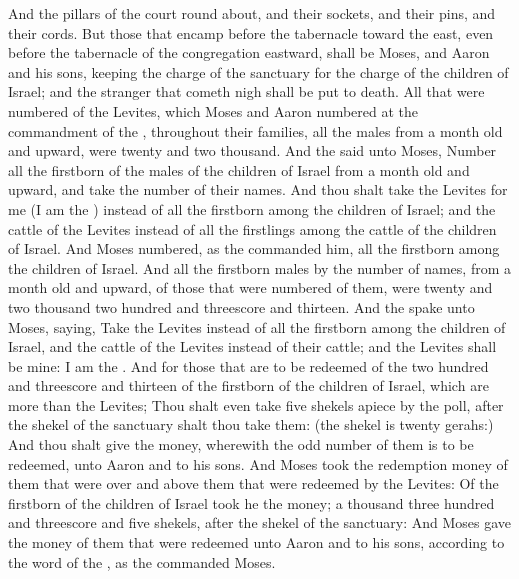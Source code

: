 \begin{biblechapter}
\verse And the pillars of the court round about, and their sockets, and their pins, and their cords.
\verse But those that encamp before the tabernacle toward the east, even before the tabernacle of the congregation eastward, shall be Moses, and Aaron and his sons, keeping the charge of the sanctuary for the charge of the children of Israel; and the stranger that cometh nigh shall be put to death.
\verse All that were numbered of the Levites, which Moses and Aaron numbered at the commandment of the \LORD, throughout their families, all the males from a month old and upward, were twenty and two thousand.
\verse And the \LORD said unto Moses, Number all the firstborn of the males of the children of Israel from a month old and upward, and take the number of their names.
\verse And thou shalt take the Levites for me (I am the \LORD) instead of all the firstborn among the children of Israel; and the cattle of the Levites instead of all the firstlings among the cattle of the children of Israel.
\verse And Moses numbered, as the \LORD commanded him, all the firstborn among the children of Israel.
\verse And all the firstborn males by the number of names, from a month old and upward, of those that were numbered of them, were twenty and two thousand two hundred and threescore and thirteen.
\verse And the \LORD spake unto Moses, saying,
\verse Take the Levites instead of all the firstborn among the children of Israel, and the cattle of the Levites instead of their cattle; and the Levites shall be mine: I am the \LORD.
\verse And for those that are to be redeemed of the two hundred and threescore and thirteen of the firstborn of the children of Israel, which are more than the Levites;
\verse Thou shalt even take five shekels apiece by the poll, after the shekel of the sanctuary shalt thou take them: (the shekel is twenty gerahs:)
\verse And thou shalt give the money, wherewith the odd number of them is to be redeemed, unto Aaron and to his sons.
\verse And Moses took the redemption money of them that were over and above them that were redeemed by the Levites:
\verse Of the firstborn of the children of Israel took he the money; a thousand three hundred and threescore and five shekels, after the shekel of the sanctuary:
\verse And Moses gave the money of them that were redeemed unto Aaron and to his sons, according to the word of the \LORD, as the \LORD commanded Moses.
\end{biblechapter}

